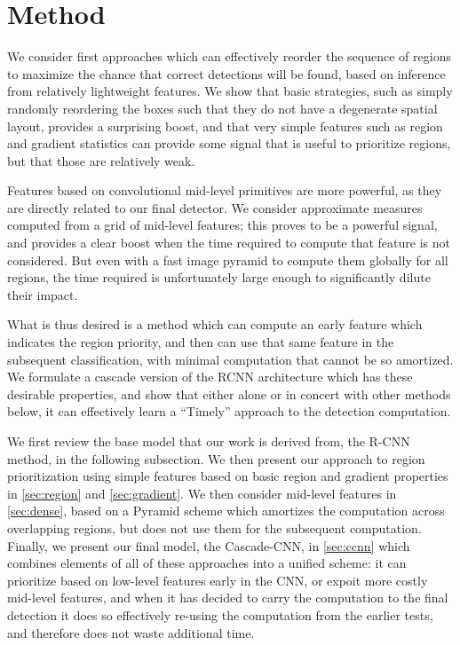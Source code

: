 \section{Method}\label{sec:method}

We consider first approaches which can effectively reorder the sequence of regions to maximize the chance that correct detections will be found, based on inference from relatively lightweight features.  We show that basic strategies, such as simply randomly reordering the boxes such that they do not have a degenerate spatial layout, provides a surprising boost, and that very simple features such as region and gradient statistics can provide some signal that is useful to prioritize regions, but that those are relatively weak.

Features based on convolutional mid-level primitives are more powerful, as they are directly related to our final detector.  We consider approximate measures computed from a grid of mid-level features; this proves to be a powerful signal, and provides a clear boost when the time required to compute that feature is not considered.    But even with a fast image pyramid to compute them globally for all regions, the time required is unfortunately large enough to significantly dilute their impact.

What is thus desired is a method which can compute an early feature which indicates the region priority, and then can use that same feature in the subsequent classification, with minimal computation that cannot be so amortized.  We formulate a cascade version of the RCNN architecture which has these desirable properties, and show that either alone or in concert with other methods below, it can effectively learn a ``Timely'' approach to the detection computation.

We first review the base model that our work is derived from, the R-CNN method, in the following subsection.  We then present our approach to region prioritization using simple features based on basic region and gradient properties in \autoref{sec:region} and \autoref{sec:gradient}.  We then consider mid-level features in \autoref{sec:dense}, based on a Pyramid scheme which amortizes the computation across overlapping regions, but does not use them for the subsequent computation.  Finally, we present our final model, the Cascade-CNN, in \autoref{sec:ccnn} which combines elements of all of these approaches into a unified scheme: it can prioritize based on low-level features early in the CNN, or expoit more costly mid-level features, and when it has decided to carry the computation to the final detection it does so effectively re-using the computation from the earlier tests, and therefore does not waste additional time.

